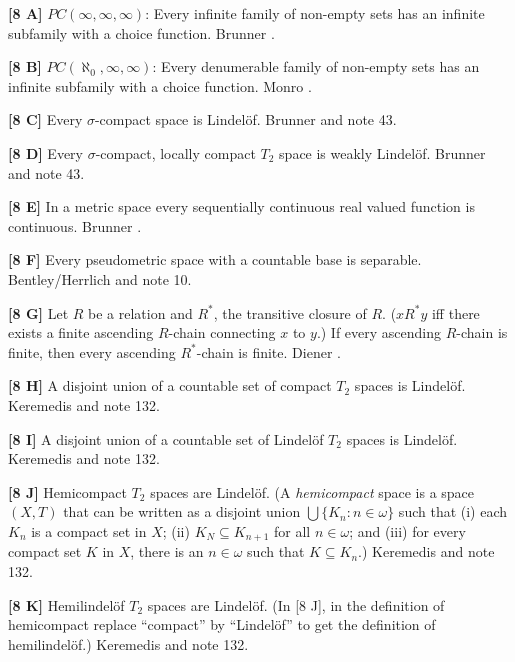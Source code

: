 \smallskip
\item{}{\bf [8 A]}  $PC(\infty,\infty,\infty)$: Every infinite family of
non-empty sets has an infinite subfamily with a choice function.
\ac{Brunner} \cite{1983b}.
\smallskip
\item{}{\bf [8 B]}  $PC(\aleph_{0},\infty,\infty)$:  Every denumerable
family of non-empty sets has an infinite subfamily with a choice
function. \ac{Monro} \cite{1975}.
\smallskip
\item{}{\bf [8 C]} Every $\sigma$-compact space is Lindel\"of.
\ac{Brunner} \cite{1982b}  and note 43.
\smallskip
\item{}{\bf [8 D]}  Every $\sigma $-compact, locally compact $T_{2}$
space  is weakly Lindel\"of.  \ac{Brunner} \cite{1982b} and note 43.
\smallskip
\item{}{\bf [8 E]}  In a metric space every sequentially  continuous  real
valued function is continuous.  \ac{Brunner} \cite{1982c}.
\smallskip
\item{}{\bf [8 F]} Every pseudometric space with a countable base is
separable.  \ac{Bentley/Herrlich} \cite{1998} and note 10.
\smallskip
\item{}{\bf [8 G]}  Let $R$ be a relation and $R^*$, the transitive closure
of $R$. ($x\mathrel {R^*}y$ iff there exists a finite ascending $R$-chain
connecting $x$ to $y$.) If every ascending $R$-chain is finite, then every
ascending $R^*$-chain is finite. \ac{Diener} \cite{1994}.
\smallskip
\item{}{\bf [8 H]} A disjoint union of a countable set of compact
$T_2$ spaces is Lindel\"of. \ac{Keremedis} \cite{1998b} and note 132.
\smallskip
\item{}{\bf [8 I]} A disjoint union of a countable set of Lindel\"of
$T_2$ spaces is Lindel\"of. \ac{Keremedis} \cite{1998b} and note 132.
\smallskip
\item{}{\bf [8 J]} Hemicompact $T_2$ spaces are Lindel\"of.
(A {\it hemicompact} space is a space $(X,T)$ that can be written
as a disjoint union $\bigcup\{K_n: n\in\omega\}$ such that
(i) each $K_n$ is a compact set in $X$;
(ii) $K_N\subseteq K_{n+1}$ for all $n\in\omega$; and
(iii) for every compact set $K$ in $X$, there is an $n\in\omega$
such that $K\subseteq K_n$.) \ac{Keremedis} \cite{1998b} and note 132.
\smallskip
\item{}{\bf [8 K]} Hemilindel\"of $T_2$ spaces are Lindel\"of.
(In [8 J], in the definition of hemicompact replace ``compact''
by ``Lindel\"of'' to get the definition of hemilindel\"of.)
\ac{Keremedis} \cite{1998b} and note 132.
